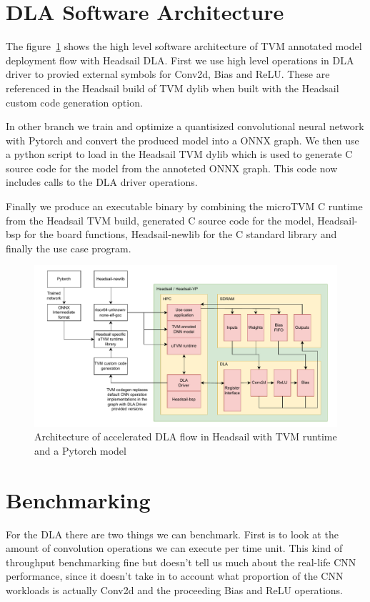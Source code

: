 \documentclass[12pt,a4paper,english
]{tunithesis}
\begin{document}
\section{DLA Software Architecture}
The figure~\ref{fig:architecture} shows the high level software architecture of TVM annotated model deployment flow with Headsail DLA. First we use high level operations in DLA driver to provied external symbols for Conv2d, Bias and ReLU. These are referenced in the Headsail build of TVM dylib when built with the Headsail custom code generation option.

In other branch we train and optimize a quantisized convolutional neural network with Pytorch and convert the produced model into a ONNX graph.
We then use a python script to load in the Headsail TVM dylib which is used to generate C source code for the model from the annoteted ONNX graph. This code now includes calls to the DLA driver operations.

Finally we produce an executable binary by combining the microTVM C runtime from the Headsail TVM build, generated C source code for the model, Headsail-bsp for the board functions, Headsail-newlib for the C standard library and finally the use case program.

\begin{figure}
  \centering
  \includegraphics[width=\textwidth]{img/dla-architecture.pdf}
  \caption{Architecture of accelerated DLA flow in Headsail with TVM runtime and a Pytorch model}
  \label{fig:architecture}
\end{figure}


\section{Benchmarking}
For the DLA there are two things we can benchmark. First is to look at the amount of convolution operations we can execute per time unit. This kind of throughput benchmarking fine but doesn't tell us much about the real-life CNN performance, since it doesn't take in to account what proportion of the CNN workloads is actually Conv2d and the proceeding Bias and ReLU operations.
\end{document}
